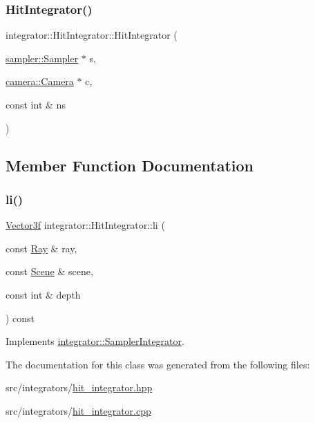 \subsubsection{\texorpdfstring{HitIntegrator()}{HitIntegrator()}}
{\footnotesize\ttfamily integrator\+::\+Hit\+Integrator\+::\+Hit\+Integrator (\begin{DoxyParamCaption}\item[{\mbox{\hyperlink{classsampler_1_1Sampler}{sampler\+::\+Sampler}} $\ast$}]{s,  }\item[{\mbox{\hyperlink{classcamera_1_1Camera}{camera\+::\+Camera}} $\ast$}]{c,  }\item[{const int \&}]{ns }\end{DoxyParamCaption})}



\subsection{Member Function Documentation}
\mbox{\label{classintegrator_1_1HitIntegrator_ad496bec99d8dbb65eeb0b32787f087dc}} 
\subsubsection{\texorpdfstring{li()}{li()}}
{\footnotesize\ttfamily \mbox{\hyperlink{cyclop_8hpp_a5a0a2e85b081623ef3f7e7e8d43024f5}{Vector3f}} integrator\+::\+Hit\+Integrator\+::li (\begin{DoxyParamCaption}\item[{const \mbox{\hyperlink{classRay}{Ray}} \&}]{ray,  }\item[{const \mbox{\hyperlink{classScene}{Scene}} \&}]{scene,  }\item[{const int \&}]{depth }\end{DoxyParamCaption}) const\hspace{0.3cm}{\ttfamily [virtual]}}



Implements \mbox{\hyperlink{classintegrator_1_1SamplerIntegrator_ae08842b8b93175f1ee23a93733161181}{integrator\+::\+Sampler\+Integrator}}.



The documentation for this class was generated from the following files\+:\begin{DoxyCompactItemize}
\item 
src/integrators/\mbox{\hyperlink{hit__integrator_8hpp}{hit\+\_\+integrator.\+hpp}}\item 
src/integrators/\mbox{\hyperlink{hit__integrator_8cpp}{hit\+\_\+integrator.\+cpp}}\end{DoxyCompactItemize}
